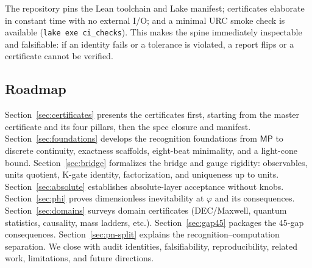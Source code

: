 \documentclass[11pt,a4paper,twoside]{article}
\numberwithin{equation}{section}
\renewcommand{\phi}{\varphi}
\theoremstyle{customthm}
\theoremstyle{customdef}
\theoremstyle{customrem}
\begin{document}
The repository pins the Lean toolchain and Lake manifest; certificates elaborate in constant time with no external I/O; and a minimal URC smoke check is available (\texttt{lake exe ci\_checks}). This makes the spine immediately inspectable and falsifiable: if an identity fails or a tolerance is violated, a report flips or a certificate cannot be verified.

\subsection{Roadmap}

Section~\ref{sec:certificates} presents the certificates first, starting from the master certificate and its four pillars, then the spec closure and manifest. Section~\ref{sec:foundations} develops the recognition foundations from \(\mathsf{MP}\) to discrete continuity, exactness scaffolds, eight-beat minimality, and a light-cone bound. Section~\ref{sec:bridge} formalizes the bridge and gauge rigidity: observables, units quotient, K-gate identity, factorization, and uniqueness up to units. Section~\ref{sec:absolute} establishes absolute-layer acceptance without knobs. Section~\ref{sec:phi} proves dimensionless inevitability at \(\phi\) and its consequences. Section~\ref{sec:domains} surveys domain certificates (DEC/Maxwell, quantum statistics, causality, mass ladders, etc.). Section~\ref{sec:gap45} packages the 45-gap consequences. Section~\ref{sec:pn-split} explains the recognition–computation separation. We close with audit identities, falsifiability, reproducibility, related work, limitations, and future directions.

\end{document}
